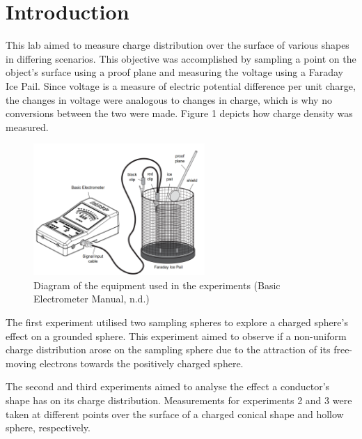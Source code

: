 \section{Introduction}


This lab aimed to measure charge distribution over the surface of various shapes in differing scenarios. This objective was accomplished by sampling a point on the object's surface using a proof plane and measuring the voltage using a Faraday Ice Pail. Since voltage is a measure of electric potential difference per unit charge, the changes in voltage were analogous to changes in charge, which is why no conversions between the two were made. Figure 1 depicts how charge density was measured.


\begin{figure}[h]
    \centering
    \includegraphics[height=5cm]{photos/equipment.png} 
    \caption{Diagram of the equipment used in the experiments (Basic Electrometer Manual, n.d.)}
    \label{fig:equipment}
\end{figure}

The first experiment utilised two sampling spheres to explore a charged sphere's effect on a grounded sphere. This experiment aimed to observe if a non-uniform charge distribution arose on the sampling sphere due to the attraction of its free-moving electrons towards the positively charged sphere. 

The second and third experiments aimed to analyse the effect a conductor's shape has on its charge distribution. Measurements for experiments 2 and 3 were taken at different points over the surface of a charged conical shape and hollow sphere, respectively. 




\newpage